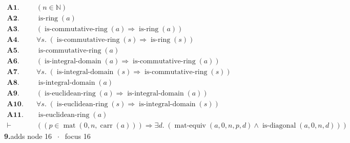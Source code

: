 \documentclass[11pt]{article}
\theoremstyle{plain}
\newcommand{\fit}[1]{\resizebox{\ifdim\width>\linewidth\linewidth\else\width\fi}{!}{#1}}
\begin{document}
\begin{align*}
  \mathbf{A1.}\quad & (n \in \mathbb{N}) \\
  \mathbf{A2.}\quad & \operatorname{is\text{-}ring}(a) \\
  \mathbf{A3.}\quad & (\operatorname{is\text{-}commutative\text{-}ring}(a) \Rightarrow \operatorname{is\text{-}ring}(a)) \\
  \mathbf{A4.}\quad & \forall s.\; (\operatorname{is\text{-}commutative\text{-}ring}(s) \Rightarrow \operatorname{is\text{-}ring}(s)) \\
  \mathbf{A5.}\quad & \operatorname{is\text{-}commutative\text{-}ring}(a) \\
  \mathbf{A6.}\quad & (\operatorname{is\text{-}integral\text{-}domain}(a) \Rightarrow \operatorname{is\text{-}commutative\text{-}ring}(a)) \\
  \mathbf{A7.}\quad & \forall s.\; (\operatorname{is\text{-}integral\text{-}domain}(s) \Rightarrow \operatorname{is\text{-}commutative\text{-}ring}(s)) \\
  \mathbf{A8.}\quad & \operatorname{is\text{-}integral\text{-}domain}(a) \\
  \mathbf{A9.}\quad & (\operatorname{is\text{-}euclidean\text{-}ring}(a) \Rightarrow \operatorname{is\text{-}integral\text{-}domain}(a)) \\
  \mathbf{A10.}\quad & \forall s.\; (\operatorname{is\text{-}euclidean\text{-}ring}(s) \Rightarrow \operatorname{is\text{-}integral\text{-}domain}(s)) \\
  \mathbf{A11.}\quad & \operatorname{is\text{-}euclidean\text{-}ring}(a) \\
  \vdash\quad & ((p \in \operatorname{mat}(0, n, \operatorname{carr}(a))) \Rightarrow \exists d.\; (\operatorname{mat\text{-}equiv}(a, 0, n, p, d) \wedge \operatorname{is\text{-}diagonal}(a, 0, n, d)))
\end{align*}
\medskip\noindent\textbf{9.}\quad \fit{\texttt{(di)}}\hfill{\small adds node 16 $\;\cdot\;$ focus 16}\\[2pt]
\end{document}
